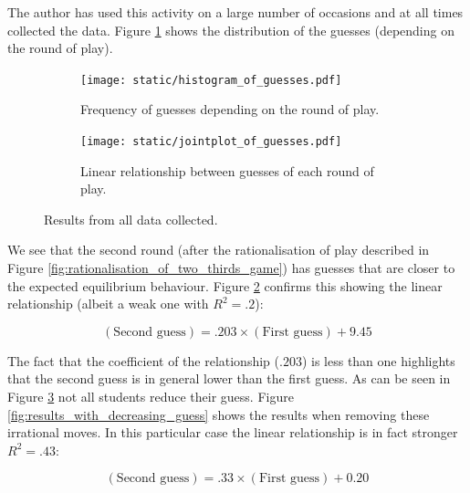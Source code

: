 \documentclass[12pt, a4paper]{article}
\begin{document}
The author has used this activity on a large number of occasions and at all
times collected the data. Figure \ref{fig:histogram_of_guess} shows the
distribution of the guesses (depending on the round of play).

\begin{figure}[!hbtp]
    \begin{subfigure}{.6\textwidth}
        \centering
        \texttt{[image: static/histogram\_of\_guesses.pdf]}
        \caption{Frequency of guesses depending on the round of play.}
        \label{fig:histogram_of_guess}
    \end{subfigure}
    \begin{subfigure}{.4\textwidth}
        \centering
        \texttt{[image: static/jointplot\_of\_guesses.pdf]}
        \caption{Linear relationship between guesses of each round of play.}
        \label{fig:jointplot_of_guess}
    \end{subfigure}
    \caption{Results from all data collected.}
    \label{fig:all_results}
\end{figure}

We see that the second round (after the rationalisation of play described in
Figure \ref{fig:rationalisation_of_two_thirds_game}) has guesses that are closer
to the expected equilibrium behaviour.
Figure \ref{fig:jointplot_of_guess} confirms this showing the linear
relationship (albeit a weak one with \(R^2=.2\)):

\begin{equation}
    (\text{Second guess}) = .203\times(\text{First guess}) + 9.45
    \label{eq:linear_relationship}
\end{equation}

The fact that the coefficient of the relationship (\(.203\)) is less than one
highlights that the second guess is in general lower than the first guess. As
can be seen in Figure \ref{fig:all_results} not all students reduce their guess.
Figure \ref{fig:results_with_decreasing_guess} shows the results when removing
these irrational moves. In this particular case the linear relationship is in
fact stronger \(R^2=.43\):

\begin{equation}
    (\text{Second guess}) = .33\times(\text{First guess}) + 0.20
    \label{eq:linear_relationship_for_increasing_guesses}
\end{equation}
\end{document}
